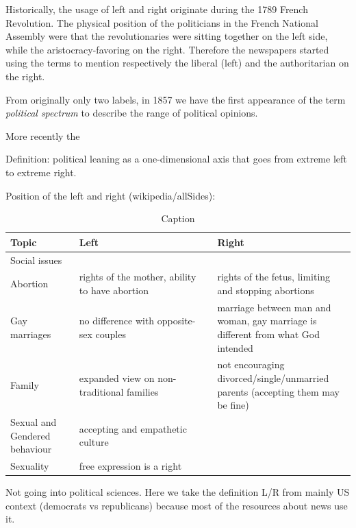 Historically, the usage of left and right originate during the 1789 French Revolution. The physical position of the politicians in the French National Assembly were that the revolutionaries were sitting together on the left side, while the aristocracy-favoring on the right. Therefore the newspapers started using the terms to mention respectively the liberal (left) and the authoritarian on the right.

From originally only two labels, in 1857 we have the first appearance of the term \emph{political spectrum} to describe the range of political opinions.

More recently the 

Definition: political leaning as a one-dimensional axis that goes from extreme left to extreme right.

Position of the left and right (wikipedia/allSides):

\begin{table}[ht]
    \centering
    \begin{tabular}{p{0.2\linewidth} | p{0.4\linewidth} | p{0.4\linewidth}}
      Topic  & Left & Right \\ \hline
      Social issues & \\
      Abortion & rights of the mother, ability to have abortion & rights of the fetus, limiting and stopping abortions \\
      Gay marriages & no difference with opposite-sex couples & marriage between man and woman, gay marriage is different from what God intended \\
      Family & expanded view on non-traditional families & not encouraging divorced/single/unmarried parents (accepting them may be fine) \\
      Sexual and Gendered behaviour & accepting and empathetic culture & \\
      Sexuality & free expression is a right & \\
      
    \end{tabular}
    \caption{Caption}
    \label{tab:my_label}
\end{table}



Not going into political sciences. Here we take the definition L/R from mainly US context (democrats vs republicans) because most of the resources about news use it.

